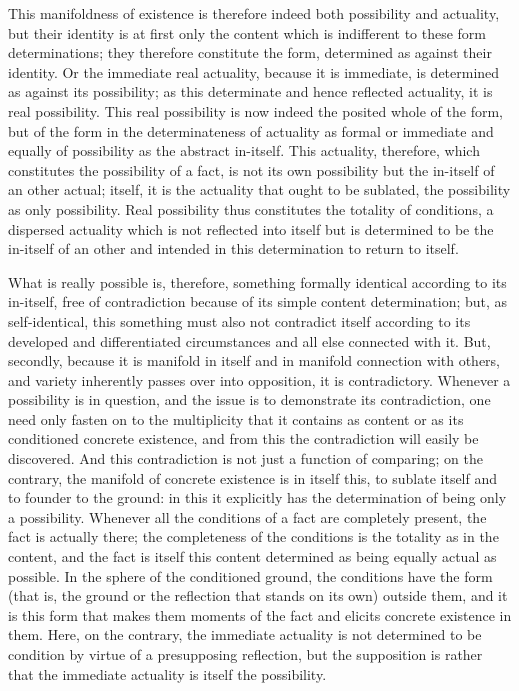 This manifoldness of existence is therefore indeed
both possibility and actuality,
but their identity is at first only the content
which is indifferent to these form determinations;
they therefore constitute the form,
determined as against their identity.
Or the immediate real actuality, because it is immediate,
is determined as against its possibility;
as this determinate and hence reflected actuality,
it is real possibility.
This real possibility is now indeed the posited whole of the form,
but of the form in the determinateness of actuality as formal
or immediate and equally of possibility as the abstract in-itself.
This actuality, therefore, which constitutes the possibility of a fact,
is not its own possibility but the in-itself of an other actual;
itself, it is the actuality that ought to be sublated,
the possibility as only possibility.
Real possibility thus constitutes the totality of conditions,
a dispersed actuality which is not reflected into itself
but is determined to be the in-itself of an other
and intended in this determination to return to itself.

What is really possible is, therefore,
something formally identical according to its in-itself,
free of contradiction because of its simple content determination;
but, as self-identical, this something must also not contradict
itself according to its developed and differentiated circumstances and all
else connected with it.
But, secondly, because it is manifold in itself
and in manifold connection with others,
and variety inherently passes over into opposition,
it is contradictory.
Whenever a possibility is in question,
and the issue is to demonstrate its contradiction,
one need only fasten on to the multiplicity that it contains as content
or as its conditioned concrete existence,
and from this the contradiction will easily be discovered.
And this contradiction is not just a function of comparing;
on the contrary, the manifold of concrete existence is in itself this,
to sublate itself and to founder to the ground:
in this it explicitly has the determination of
being only a possibility.
Whenever all the conditions of a fact are completely present,
the fact is actually there;
the completeness of the conditions is
the totality as in the content,
and the fact is itself this content determined
as being equally actual as possible.
In the sphere of the conditioned ground,
the conditions have the form
(that is, the ground or the reflection that stands on its own)
outside them,
and it is this form that makes them moments
of the fact and elicits concrete existence in them.
Here, on the contrary, the immediate actuality is
not determined to be condition by virtue of
a presupposing reflection,
but the supposition is rather that the immediate actuality is
itself the possibility.

